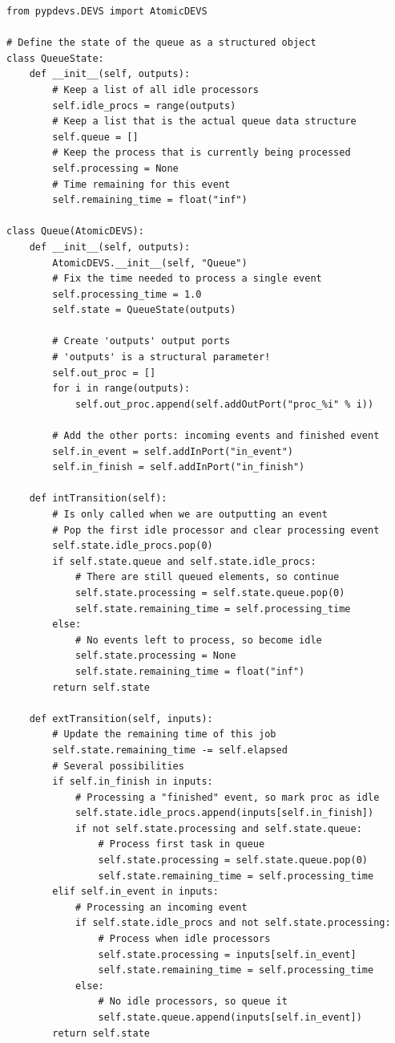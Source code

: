 \begin{verbatim}
from pypdevs.DEVS import AtomicDEVS

# Define the state of the queue as a structured object
class QueueState:
    def __init__(self, outputs):
        # Keep a list of all idle processors
        self.idle_procs = range(outputs)
        # Keep a list that is the actual queue data structure
        self.queue = []
        # Keep the process that is currently being processed
        self.processing = None
        # Time remaining for this event
        self.remaining_time = float("inf")

class Queue(AtomicDEVS):
    def __init__(self, outputs):
        AtomicDEVS.__init__(self, "Queue")
        # Fix the time needed to process a single event
        self.processing_time = 1.0
        self.state = QueueState(outputs)

        # Create 'outputs' output ports
        # 'outputs' is a structural parameter!
        self.out_proc = []
        for i in range(outputs):
            self.out_proc.append(self.addOutPort("proc_%i" % i))

        # Add the other ports: incoming events and finished event
        self.in_event = self.addInPort("in_event")
        self.in_finish = self.addInPort("in_finish")

    def intTransition(self):
        # Is only called when we are outputting an event
        # Pop the first idle processor and clear processing event
        self.state.idle_procs.pop(0)
        if self.state.queue and self.state.idle_procs:
            # There are still queued elements, so continue
            self.state.processing = self.state.queue.pop(0)
            self.state.remaining_time = self.processing_time
        else:
            # No events left to process, so become idle
            self.state.processing = None
            self.state.remaining_time = float("inf")
        return self.state

    def extTransition(self, inputs):
        # Update the remaining time of this job
        self.state.remaining_time -= self.elapsed
        # Several possibilities
        if self.in_finish in inputs:
            # Processing a "finished" event, so mark proc as idle
            self.state.idle_procs.append(inputs[self.in_finish])
            if not self.state.processing and self.state.queue:
                # Process first task in queue
                self.state.processing = self.state.queue.pop(0)
                self.state.remaining_time = self.processing_time
        elif self.in_event in inputs:
            # Processing an incoming event
            if self.state.idle_procs and not self.state.processing:
                # Process when idle processors
                self.state.processing = inputs[self.in_event]
                self.state.remaining_time = self.processing_time
            else:
                # No idle processors, so queue it
                self.state.queue.append(inputs[self.in_event])
        return self.state


\end{verbatim}
